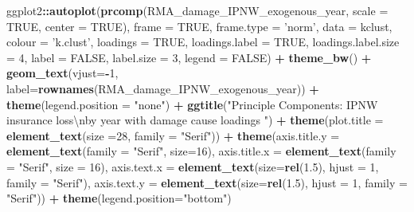 \documentclass[]{article}
\newenvironment{Shaded}{\begin{snugshade}}{\end{snugshade}}
\newcommand{\CharTok}[1]{\textcolor[rgb]{0.31,0.60,0.02}{#1}}
\newcommand{\DataTypeTok}[1]{\textcolor[rgb]{0.13,0.29,0.53}{#1}}
\newcommand{\DecValTok}[1]{\textcolor[rgb]{0.00,0.00,0.81}{#1}}
\newcommand{\FloatTok}[1]{\textcolor[rgb]{0.00,0.00,0.81}{#1}}
\newcommand{\KeywordTok}[1]{\textcolor[rgb]{0.13,0.29,0.53}{\textbf{#1}}}
\newcommand{\NormalTok}[1]{#1}
\newcommand{\OperatorTok}[1]{\textcolor[rgb]{0.81,0.36,0.00}{\textbf{#1}}}
\newcommand{\OtherTok}[1]{\textcolor[rgb]{0.56,0.35,0.01}{#1}}
\newcommand{\StringTok}[1]{\textcolor[rgb]{0.31,0.60,0.02}{#1}}
\begin{document}
\begin{Shaded}
\begin{Highlighting}[]
\NormalTok{ggplot2}\OperatorTok{::}\KeywordTok{autoplot}\NormalTok{(}\KeywordTok{prcomp}\NormalTok{(RMA_damage_IPNW_exogenous_year, }\DataTypeTok{scale =} \OtherTok{TRUE}\NormalTok{, }\DataTypeTok{center =} \OtherTok{TRUE}\NormalTok{), }\DataTypeTok{frame =} \OtherTok{TRUE}\NormalTok{, }\DataTypeTok{frame.type =} \StringTok{'norm'}\NormalTok{, }\DataTypeTok{data =}\NormalTok{ kclust, }\DataTypeTok{colour =} \StringTok{'k.clust'}\NormalTok{, }\DataTypeTok{loadings =} \OtherTok{TRUE}\NormalTok{, }\DataTypeTok{loadings.label =} \OtherTok{TRUE}\NormalTok{, }\DataTypeTok{loadings.label.size  =} \DecValTok{4}\NormalTok{, }\DataTypeTok{label =} \OtherTok{FALSE}\NormalTok{, }\DataTypeTok{label.size =} \DecValTok{3}\NormalTok{, }\DataTypeTok{legend =} \OtherTok{FALSE}\NormalTok{)  }\OperatorTok{+}\StringTok{ }\KeywordTok{theme_bw}\NormalTok{()   }\OperatorTok{+}\StringTok{ }\KeywordTok{geom_text}\NormalTok{(}\DataTypeTok{vjust=}\OperatorTok{-}\DecValTok{1}\NormalTok{, }\DataTypeTok{label=}\KeywordTok{rownames}\NormalTok{(RMA_damage_IPNW_exogenous_year)) }\OperatorTok{+}\StringTok{ }\KeywordTok{theme}\NormalTok{(}\DataTypeTok{legend.position =} \StringTok{"none"}\NormalTok{) }\OperatorTok{+}\StringTok{ }\KeywordTok{ggtitle}\NormalTok{(}\StringTok{"Principle Components: IPNW insurance loss}\CharTok{\textbackslash{}n}\StringTok{by year with damage cause loadings "}\NormalTok{) }\OperatorTok{+}\StringTok{ }\KeywordTok{theme}\NormalTok{(}\DataTypeTok{plot.title =} \KeywordTok{element_text}\NormalTok{(}\DataTypeTok{size =}\DecValTok{28}\NormalTok{, }\DataTypeTok{family =} \StringTok{"Serif"}\NormalTok{)) }\OperatorTok{+}\StringTok{ }\KeywordTok{theme}\NormalTok{(}\DataTypeTok{axis.title.y =} \KeywordTok{element_text}\NormalTok{(}\DataTypeTok{family =} \StringTok{"Serif"}\NormalTok{, }\DataTypeTok{size=}\DecValTok{16}\NormalTok{), }\DataTypeTok{axis.title.x =} \KeywordTok{element_text}\NormalTok{(}\DataTypeTok{family =} \StringTok{"Serif"}\NormalTok{, }\DataTypeTok{size =} \DecValTok{16}\NormalTok{), }\DataTypeTok{axis.text.x =} \KeywordTok{element_text}\NormalTok{(}\DataTypeTok{size=}\KeywordTok{rel}\NormalTok{(}\FloatTok{1.5}\NormalTok{), }\DataTypeTok{hjust =} \DecValTok{1}\NormalTok{, }\DataTypeTok{family =} \StringTok{"Serif"}\NormalTok{), }\DataTypeTok{axis.text.y =} \KeywordTok{element_text}\NormalTok{(}\DataTypeTok{size=}\KeywordTok{rel}\NormalTok{(}\FloatTok{1.5}\NormalTok{), }\DataTypeTok{hjust =} \DecValTok{1}\NormalTok{, }\DataTypeTok{family =} \StringTok{"Serif"}\NormalTok{)) }\OperatorTok{+}\StringTok{ }\KeywordTok{theme}\NormalTok{(}\DataTypeTok{legend.position=}\StringTok{"bottom"}\NormalTok{) }
\end{Highlighting}
\end{Shaded}
\end{document}
